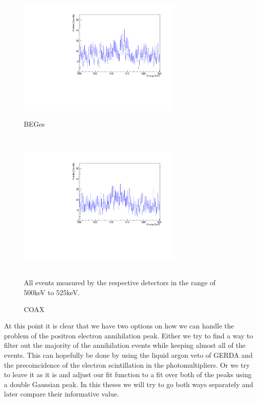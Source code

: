 \begin{figure}[t!]
\centering
\begin{minipage}{.5\textwidth}
  \centering
	\includegraphics[width=80mm]{./Bilder/500525NoFilterBEGes.pdf}
  \label{fig:NoFilterBEGes}
  \caption{BEGes}
\end{minipage}~
\begin{minipage}{.5\textwidth}
  \centering
	\includegraphics[width=80mm]{./Bilder/500525NoFilterCOAX.pdf}
  \caption{COAX}
  \label{fig:NoFilterCOAX}
\end{minipage}
    \\
	\vspace{0.5cm}
	All events measured by the respective detectors in the range of 500keV to 525keV.
\end{figure}

At this point it is clear that we have two options on how we can handle the problem of the positron electron annihilation peak. 
Either we try to find a way to filter out the majority of the annihilation events while keeping almost all of the  events. 
This can hopefully be done by using the liquid argon veto of GERDA and the precoincidence of the electron scintillation in the photomultipliers. 
Or we try to leave it as it is and adjust our fit function to a fit over both of the peaks using a double Gaussian peak. 
In this theses we will try to go both ways separately and later compare their informative value.
\\

